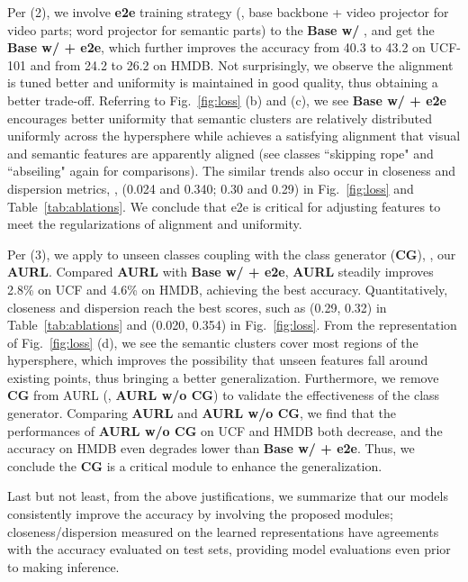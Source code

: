 \documentclass[10pt,twocolumn,letterpaper]{article}
\begin{document}
Per (2), we involve {\bf e2e} training strategy (\ie, base backbone + video projector for video parts; word projector for semantic parts) to the {\bf Base w/ }, and get the {\bf Base w/  + e2e}, which further improves the accuracy from 40.3 to 43.2 on UCF-101 and from 24.2 to 26.2 on HMDB.
Not surprisingly, we observe the alignment is tuned better and uniformity is maintained in good quality, thus obtaining a better trade-off.
Referring to Fig.~\ref{fig:loss} (b) and (c), we see {\bf Base w/  + e2e} encourages better uniformity that semantic clusters are relatively distributed uniformly across the hypersphere while achieves a satisfying alignment that visual and semantic features are apparently aligned (see classes ``skipping rope" and ``abseiling" again for comparisons).
The similar trends also occur in closeness and dispersion metrics, \ie, (0.024 and 0.340; 0.30 and 0.29) in Fig.~\ref{fig:loss} and Table~\ref{tab:ablations}.
We conclude that e2e is critical for adjusting features to meet the regularizations of alignment and uniformity.

Per (3), we apply {\bf } to unseen classes coupling with the class generator ({\bf CG}), \ie, our {\bf AURL}.
Compared {\bf AURL} with {\bf Base w/  + e2e}, {\bf AURL} steadily improves 2.8\% on UCF and 4.6\% on HMDB, achieving the best accuracy.
Quantitatively, closeness and dispersion reach the best scores, such as (0.29, 0.32)  in Table~\ref{tab:ablations} and (0.020, 0.354) in Fig.~\ref{fig:loss}.
From the representation of Fig.~\ref{fig:loss} (d), we see the semantic clusters cover most regions of the hypersphere, which improves the possibility that unseen features fall around existing points, thus bringing a better generalization.
Furthermore, we remove {\bf CG} from AURL (\ie, {\bf AURL w/o CG}) to validate the effectiveness of the class generator.
Comparing {\bf AURL} and {\bf AURL w/o CG}, we find that the performances of {\bf AURL w/o CG} on UCF and HMDB both decrease, and the accuracy on HMDB even degrades lower than {\bf Base w/  + e2e}.
Thus, we conclude the {\bf CG} is a critical module to enhance the generalization.

Last but not least, from the above justifications, we summarize that our models consistently improve the accuracy by involving the proposed modules;
closeness/dispersion measured on the learned representations have agreements with the accuracy evaluated on test sets, providing model evaluations even prior to making inference.
\end{document}
